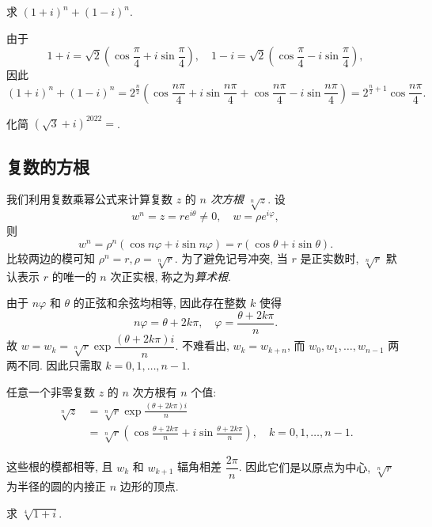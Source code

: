 \begin{example}
  求 $(1+i)^n+(1-i)^n$.
\end{example}

\begin{solution}
  由于
  \[
    1+i=\sqrt2\left(\cos\frac\pi4+i\sin\frac\pi4\right),\quad
    1-i=\sqrt2\left(\cos\frac\pi4-i\sin\frac\pi4\right),
  \]
  因此
    \[
       (1+i)^n+(1-i)^n
      =2^{\frac n2}\left(\cos\frac{n\pi}4+i\sin\frac{n\pi}4 
       +\cos\frac{n\pi}4-i\sin\frac{n\pi}4\right)
      =2^{\frac n2+1}\cos\frac{n\pi}4.
    \]
\end{solution}

\begin{exercise}
  化简 $(\sqrt3+i)^{2022}=$\fillblank[2cm]{}.
\end{exercise}


\subsection{复数的方根}

我们利用复数乘幂公式来计算复数 $z$ 的 \emph{$n$ 次方根 $\sqrt[n]z$}.
设
  \[w^n=z=re^{i\theta}\neq0,\quad w=\rho e^{i\varphi},\]
则
  \[
    w^n=\rho^n(\cos{n\varphi}+i\sin{n\varphi})
       =r(\cos\theta+i\sin\theta).
  \]
比较两边的模可知 $\rho^n=r,\rho=\sqrt[n]r$.
为了避免记号冲突, 当 $r$ 是正实数时, $\sqrt[n]r$ 默认表示 $r$ 的唯一的 $n$ 次正实根, 称之为\emph{算术根}.

由于 $n\varphi$ 和 $\theta$ 的正弦和余弦均相等, 因此存在整数 $k$ 使得
  \[n\varphi=\theta+2k\pi,\quad \varphi=\frac{\theta+2k\pi}n.\]
故 $w=w_k=\sqrt[n]r\exp\dfrac{(\theta+2k\pi)i}n$.
不难看出, $w_k=w_{k+n}$, 而 $w_0,w_1,\dots,w_{n-1}$ 两两不同.
因此只需取 $k=0,1,\dots,n-1$.
\begin{theorem}[复数的方根]
  任意一个非零复数 $z$ 的 $n$ 次方根有 $n$ 个值:
  \begin{align*}
    \sqrt[n]z&=\sqrt[n]r\exp\frac{(\theta+2k\pi)i}n\\
      &=\sqrt[n]r\left(\cos\frac{\theta+2k\pi}n+i\sin\frac{\theta+2k\pi}n\right),\quad k=0,1,\dots,n-1.
  \end{align*}
\end{theorem}
这些根的模都相等, 且 $w_k$ 和 $w_{k+1}$ 辐角相差 $\dfrac{2\pi}n$.
因此\alert{它们是以原点为中心, $\sqrt[n]r$ 为半径的圆的内接正 $n$ 边形的顶点}.

\begin{example}
  求 $\sqrt[4]{1+i}$.
\end{example}

